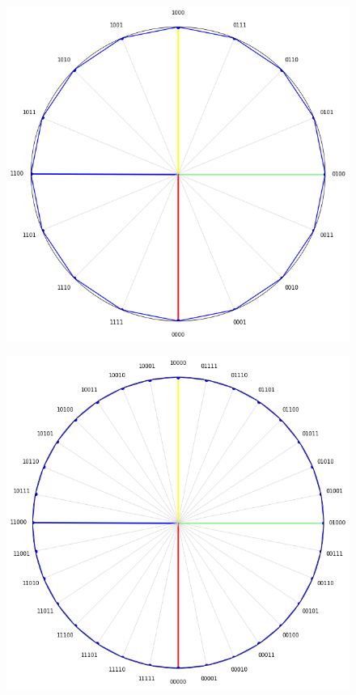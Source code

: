 \begin{figure}
\centering
\begin{minipage}{.5\textwidth}
  \centering
  \includegraphics[width=0.9\linewidth]{img/posit4xRing.png}
  \label{fig:posit4xRing}
\end{minipage}%
\begin{minipage}{.5\textwidth}
  \centering
  \includegraphics[width=0.9\linewidth]{img/posit5ring.png}
  \label{fig:posit5xRing}
\end{minipage}
\end{figure}

